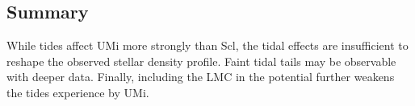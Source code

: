 \subsection{Summary}\label{summary-1}

While tides affect UMi more strongly than Scl, the tidal effects are
insufficient to reshape the observed stellar density profile. Faint
tidal tails may be observable with deeper data. Finally, including the
LMC in the potential further weakens the tides experience by UMi.
